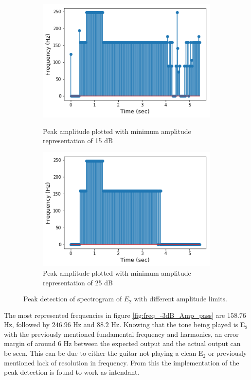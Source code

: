 \begin{figure}[H]
\begin{subfigure}{0.49\textwidth}
\end{subfigure}
\begin{subfigure}{0.49\textwidth}
\centering
\includegraphics[width=\textwidth]{figures/peak_detection/20170511_15.png}
\caption{Peak amplitude plotted with minimum amplitude representation of 15 dB}
\label{fig:freq_15dB_Amp_pass}

\includegraphics[width=\textwidth]{figures/peak_detection/20170511_25.png}
\caption{Peak amplitude plotted with minimum amplitude representation of 25 dB}
\label{fig:freq_25dB_Amp_pass}

\end{subfigure}
\caption{Peak detection of spectrogram of $E_2$ with different amplitude limits.}
\label{fig:valdation_peak_detection}
\end{figure}

The most represented frequencies in figure  \ref{fig:freq_-3dB_Amp_pass} are $158.76$ Hz, followed by $246.96$ Hz and $88.2$ Hz. 
Knowing that the tone being played is E$_2$ with the previously mentioned fundamental frequency and harmonics, an error margin of around $6$ Hz between the expected output and the actual output can be seen.
This can be due to either the guitar not playing a clean E$_2$ or previously mentioned lack of resolution in frequency. From this the implementation of the peak detection is found to work as intendant.\\

